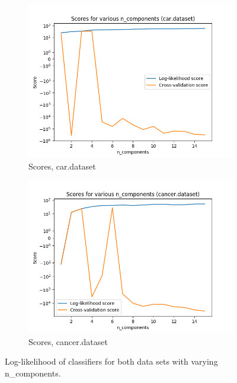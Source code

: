 \documentclass{article}
\begin{document}
        \begin{figure}[htb]
        \centering

          \begin{subfigure}{0.5\textwidth}
            \includegraphics[width=\linewidth]{out/em/car-components-testing.png}
            \caption{Scores, car.dataset}
            \label{fig:em-comp-car}
          \end{subfigure}\hfil
          \begin{subfigure}{0.5\textwidth}
            \includegraphics[width=\linewidth]{out/em/cancer-components-testing.png}
            \caption{Scores, cancer.dataset}
            \label{fig:em-comp-cancer}
          \end{subfigure}

        \caption{Log-likelihood of classifiers for both data sets with varying n\_components.}
        \label{fig:em-comp}
        \end{figure}
\end{document}
